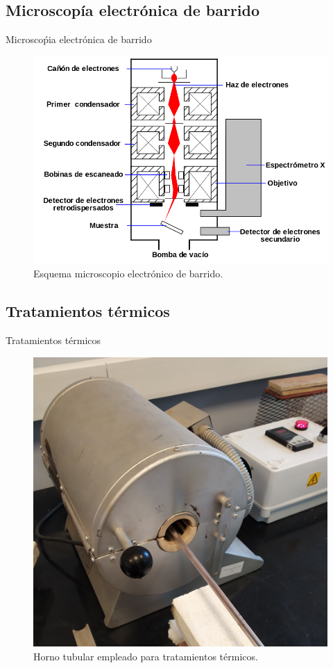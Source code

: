 \documentclass[11pt]{beamer}
\begin{document}
	\subsection{Microscopía electrónica de barrido}
		\begin{frame}{Microscoṕia electrónica de barrido}
			\begin{figure}[H]
				\centering
				\includegraphics[scale=0.25]{img/SEM.png}
				\caption*{Esquema microscopio electrónico de barrido.}
			\end{figure}
		\end{frame}
		
	\subsection{Tratamientos térmicos}
		\begin{frame}{Tratamientos térmicos}
			\begin{figure}
				\centering
				\includegraphics[scale=0.3]{img/hornito.png}
				\caption*{Horno tubular empleado para tratamientos térmicos.}				
			\end{figure}
		\end{frame}
	
\end{document}
